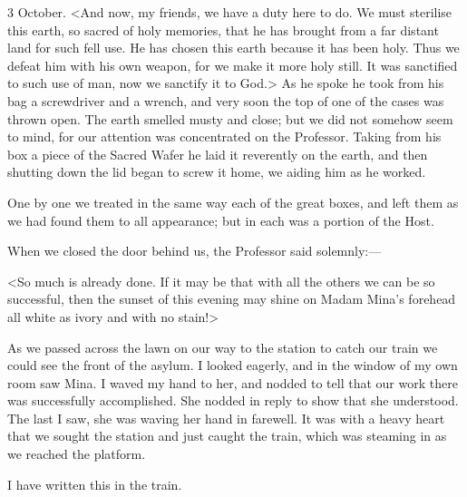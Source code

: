 \begin{diary}{3 October.}
<And now, my friends, we have a duty here to do. We must sterilise this earth, so sacred of holy memories, that he has brought from a far distant land for such fell use. He has chosen this earth because it has been holy. Thus we defeat him with his own weapon, for we make it more holy still. It was sanctified to such use of man, now we sanctify it to God.> As he spoke he took from his bag a screwdriver and a wrench, and very soon the top of one of the cases was thrown open. The earth smelled musty and close; but we did not somehow seem to mind, for our attention was concentrated on the Professor. Taking from his box a piece of the Sacred Wafer he laid it reverently on the earth, and then shutting down the lid began to screw it home, we aiding him as he worked.

One by one we treated in the same way each of the great boxes, and left them as we had found them to all appearance; but in each was a portion of the Host.

When we closed the door behind us, the Professor said solemnly:—

<So much is already done. If it may be that with all the others we can be so successful, then the sunset of this evening may shine on Madam Mina's forehead all white as ivory and with no stain!>

As we passed across the lawn on our way to the station to catch our train we could see the front of the asylum. I looked eagerly, and in the window of my own room saw Mina. I waved my hand to her, and nodded to tell that our work there was successfully accomplished. She nodded in reply to show that she understood. The last I saw, she was waving her hand in farewell. It was with a heavy heart that we sought the station and just caught the train, which was steaming in as we reached the platform.

I have written this in the train.
\end{diary}
 

